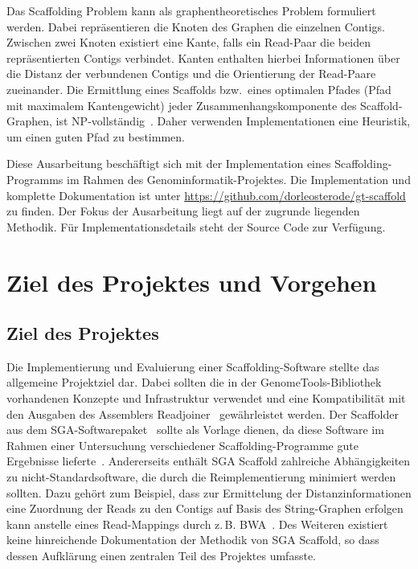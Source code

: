 \documentclass[a4paper,11pt,parskip,abstract=on]{scrartcl}
\begin{document}
Das Scaffolding Problem kann als graphentheoretisches Problem
formuliert werden. Dabei repräsentieren die Knoten des Graphen die
einzelnen Contigs. Zwischen zwei Knoten existiert eine Kante, falls
ein Read-Paar die beiden repräsentierten Contigs verbindet. Kanten
enthalten hierbei Informationen über die Distanz der verbundenen
Contigs und die Orientierung der Read-Paare zueinander. Die Ermittlung
eines Scaffolds bzw.\ eines optimalen Pfades (Pfad mit maximalem
Kantengewicht) jeder Zusammenhangskomponente des Scaffold-Graphen, ist
NP-vollständig~\cite{Huson:2002kf}. Daher verwenden Implementationen
eine Heuristik, um einen guten Pfad zu bestimmen.

Diese Ausarbeitung beschäftigt sich mit der Implementation eines
Scaffolding-Programms im Rahmen des Genominformatik-Projektes. Die
Implementation und komplette Dokumentation ist unter
\url{https://github.com/dorleosterode/gt-scaffold} zu finden. Der Fokus der
Ausarbeitung liegt auf der zugrunde liegenden Methodik. Für
Implementationsdetails steht der Source Code zur Verfügung.

\section{Ziel des Projektes und Vorgehen}
\subsection{Ziel des Projektes}
Die Implementierung und Evaluierung einer Scaffolding-Software stellte
das allgemeine Projektziel dar. Dabei sollten die in der
GenomeTools-Bibliothek~\cite{Gremme:2013} vorhandenen Konzepte und
Infrastruktur verwendet und eine Kompatibilität mit den Ausgaben des
Assemblers Readjoiner~\cite{Gonnella:2012gn} gewährleistet werden. Der
Scaffolder aus dem SGA-Softwarepaket~\cite{Simpson:2012ef} sollte als
Vorlage dienen, da diese Software im Rahmen einer Untersuchung
verschiedener Scaffolding-Programme gute Ergebnisse
lieferte~\cite{Hunt:2014dh}. Andererseits enthält SGA Scaffold
zahlreiche Abhängigkeiten zu nicht-Standardsoftware, die durch die
Reimplementierung minimiert werden sollten. Dazu gehört zum Beispiel,
dass zur Ermittelung der Distanzinformationen eine Zuordnung der Reads
zu den Contigs auf Basis des String-Graphen erfolgen kann anstelle eines
Read-Mappings durch z.\,B. BWA~\cite{Li:2009}. Des Weiteren existiert keine
hinreichende Dokumentation der Methodik von SGA Scaffold, so dass
dessen Aufklärung einen zentralen Teil des Projektes umfasste.
\end{document}

